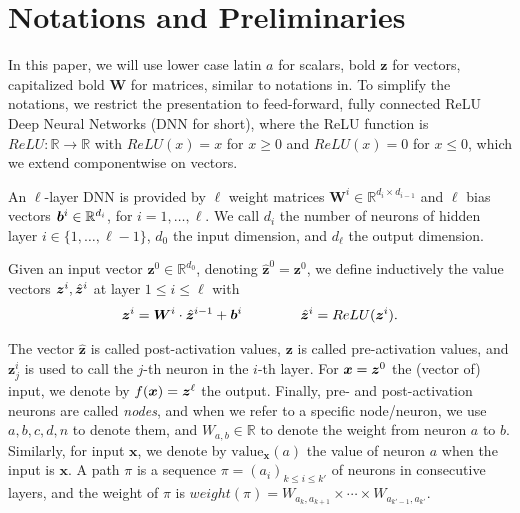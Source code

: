 \documentclass{article} %
\newcommand{\val}{{\textrm{value}}}
\theoremstyle{definition}
\begin{document}
\section{Notations and Preliminaries}

In this paper, we will use lower case latin $a$ for scalars, bold $\boldsymbol{z}$ for vectors, 
capitalized bold $\boldsymbol{W}$ for matrices, similar to notations in.
To simplify the notations, we restrict the presentation to feed-forward, 
fully connected ReLU Deep Neural Networks (DNN for short), where the ReLU function is $ReLU : \mathbb{R} \rightarrow \mathbb{R}$ with
$ReLU(x)=x$ for $x \geq 0$ and $ReLU(x)=0$ for $x \leq 0$, which we extend componentwise on vectors.




An $\ell$-layer DNN is provided by $\ell$ weight matrices 
$\boldsymbol{W}^i \in \mathbb{R}^{d_i\times d_{i-1}}$
and $\ell$ bias vectors ${\bm{b}}^i \in \mathbb{R}^{d_i}$, for $i=1, \ldots, \ell$.
We call $d_i$ the number of neurons of hidden layer $i \in \{1, \ldots, \ell-1\}$,
$d_0$ the input dimension, and $d_\ell$ the output dimension.

Given an input vector $\boldsymbol{z}^0 \in \mathbb{R}^{d_0}$, 
denoting $\hat{\boldsymbol{z}}^{0}={\boldsymbol{z}}^0$, we define inductively the value vectors $\boldsymbol{z}^i,\hat{{\bm{z}}}^i$ at layer $1 \leq i \leq \ell$ with
\begin{align*}
	\boldsymbol{z}^{i} = \boldsymbol{W}^i\cdot \hat{\boldsymbol{z}}^{i-1}+ {\bm{b}}^i \qquad \, \qquad
	\hat{\boldsymbol{z}}^{i} = ReLU({\boldsymbol{z}}^i).
\end{align*} 

The vector $\hat{\boldsymbol{z}}$ is called post-activation values, 
$\boldsymbol{z}$ is called pre-activation values, 
and $\boldsymbol{z}^{i}_j$ is used to call the $j$-th neuron in the $i$-th layer. 
For $\boldsymbol{x}={\bm{z}}^0$ the (vector of) input, we denote by $f(\boldsymbol{x})={\bm{z}}^\ell$ the output. Finally, pre- and post-activation neurons are called \emph{nodes}, and when we refer to a specific node/neuron, we use $a,b,c,d,n$ to denote them, and $W_{a,b} \in \mathbb{R}$ to denote the weight from neuron $a$ to $b$. Similarly, for input $\boldsymbol{x}$, we denote by $\val_{\boldsymbol{x}}(a)$ the value of neuron $a$ when the input is $\boldsymbol{x}$. A path $\pi$ is a sequence $\pi=(a_i)_{k \leq  i \leq k'}$ of neurons in consecutive layers, and the weight of $\pi$ is 
$weight(\pi)=W_{a_k,a_{k+1}} \times \cdots \times  W_{a_{k'-1},a_{k'}}$.
\end{document}
